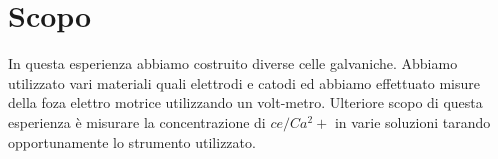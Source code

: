 \section*{Scopo}
In questa esperienza abbiamo costruito diverse celle galvaniche.
Abbiamo utilizzato vari materiali quali elettrodi e catodi ed abbiamo effettuato misure della foza elettro motrice utilizzando un volt-metro.
Ulteriore scopo di questa esperienza è misurare la concentrazione di $ce/Ca^2+$ in varie soluzioni tarando opportunamente lo strumento utilizzato.


